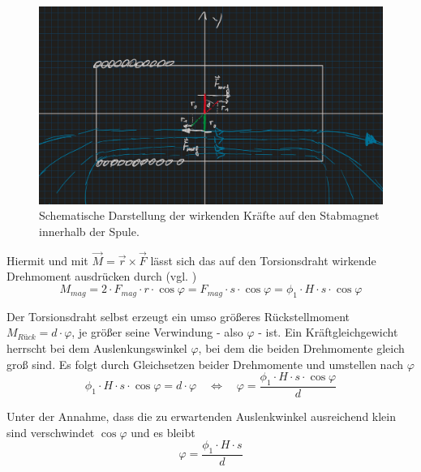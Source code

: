 \begin{figure}[h]
    \centering
    \includegraphics[width=.8\textwidth]{assets/drehmoment.jpg}
    \caption[Kräfte auf einen Stabmagnet im Magnetfeld]{Schematische Darstellung der wirkenden Kräfte auf den Stabmagnet innerhalb der Spule.}
    \label{fig:drehmoment}
\end{figure}
Hiermit und mit $\vec{M} = \vec{r} \times \vec{F}$ lässt sich das auf den Torsionsdraht wirkende Drehmoment ausdrücken durch (vgl. )
\begin{equation}
    M_{mag} = 2 \cdot F_{mag} \cdot r \cdot \cos{\varphi}
    = F_{mag} \cdot s \cdot \cos{\varphi}
    = \phi_1 \cdot H \cdot s \cdot \cos{\varphi}
    \label{eq:7}
\end{equation}

Der Torsionsdraht selbst erzeugt ein umso größeres Rückstellmoment \(M_{Rück} = d \cdot \varphi\), je größer seine Verwindung - also \(\varphi\) - ist.
Ein Kräftgleichgewicht herrscht bei dem Auslenkungswinkel $\varphi$, bei dem die beiden Drehmomente gleich groß sind.
Es folgt durch Gleichsetzen beider Drehmomente und umstellen nach $\varphi$ 
\begin{equation*}
    \phi_1 \cdot H \cdot s \cdot \cos{\varphi} = d \cdot \varphi \quad \Leftrightarrow \quad \varphi = \frac{\phi_1 \cdot H \cdot s \cdot \cos{\varphi}}{d}
\end{equation*}

Unter der Annahme, dass die zu erwartenden Auslenkwinkel ausreichend klein sind verschwindet $\cos{\varphi}$ und es bleibt
\begin{equation}
    \varphi = \frac{\phi_1 \cdot H \cdot s}{d}
    \label{eq:8}
\end{equation}
